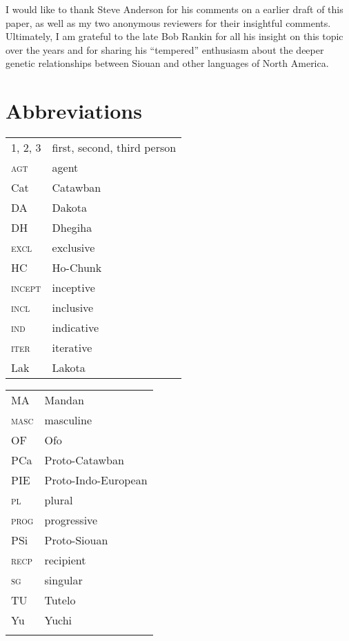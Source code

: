 \documentclass[output=paper]{LSP/langsci}
\begin{document}
I would like to thank Steve Anderson for his comments on a earlier draft of this paper, as well as my two anonymous reviewers for their insightful comments. Ultimately, I am grateful to the late Bob Rankin for all his insight on this topic over the years and for sharing his ``tempered'' enthusiasm about the deeper genetic relationships between Siouan and other languages of North America.


\section*{Abbreviations}
\begin{tabularx}{.45\textwidth}{lX}
1, 2, 3 & first, second, third person\\
\textsc{agt} & agent \\
 Cat & {Catawban}\\
 DA & {Dakota}\\
 DH & {Dhegiha}\\
 \textsc{excl} & exclusive \\
 HC & {Ho-Chunk}\\
 \textsc{incept} & inceptive \\
 \textsc{incl} & inclusive \\
 \textsc{ind} & indicative \\
 \textsc{iter} & iterative \\
 Lak & {Lakota}\\
\end{tabularx}
\begin{tabularx}{.45\textwidth}{lX}
 MA & {Mandan}\\
 \textsc{masc} & masculine \\
 OF & {Ofo}\\
 PCa & Proto-{Catawban}\\
 PIE & Proto-{Indo-European}\\
 \textsc{pl} & plural \\
 \textsc{prog} & progressive \\
 PSi & {Proto-Siouan}\\
 \textsc{recp} & recipient \\
 \textsc{sg} & singular \\
 TU & {Tutelo}\\
 Yu & {Yuchi}\\
 \\
\end{tabularx}

\nocite{CrawfordNotebooks,Crawford1979}

{\sloppy
\printbibliography[heading=subbibliography,notkeyword=this]
 }
\end{document}
